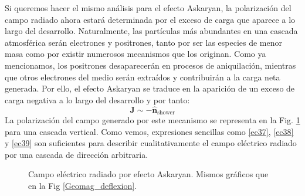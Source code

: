 \documentclass[12 pt, a4paper]{article} %
\numberwithin{equation}{section}
\numberwithin{figure}{section}
\newcommand{\vect}[1]{\boldsymbol{\mathbf{#1}}}
\begin{document}
Si queremos hacer el mismo análisis para el efecto Askaryan, la polarización del campo radiado ahora estará determinada por el exceso de carga que aparece a lo largo del desarrollo. Naturalmente, las partículas más abundantes en una cascada atmosférica serán electrones y positrones, tanto por ser las especies de menor masa como por existir numerosos mecanismos que los originan. Como ya mencionamos, los positrones desaparecerán en procesos de aniquilación, mientras que otros electrones del medio serán extraídos y contribuirán a la carga neta generada. Por ello, el efecto Askaryan se traduce en la aparición de un exceso de carga negativa a lo largo del desarrollo y por tanto:
\begin{equation}
	\vect{J}\sim -\hat{\vect{n}}_{\text{shower}}\label{ec39}
\end{equation}
La polarización del campo generado por este mecanismo se representa en la Fig. \ref{Askaryan} para una cascada vertical. Como vemos, expresiones sencillas como \eqref{ec37}, \eqref{ec38} y \eqref{ec39} son suficientes para describir cualitativamente el campo eléctrico radiado por una cascada de dirección arbitraria.
\begin{figure}[H]
	\centering
	\hspace{10mm}
	\caption{Campo eléctrico radiado por efecto Askaryan. Mismos gráficos que en la Fig \ref{Geomag_deflexion}.}
	\label{Askaryan}
\end{figure}
\end{document}
